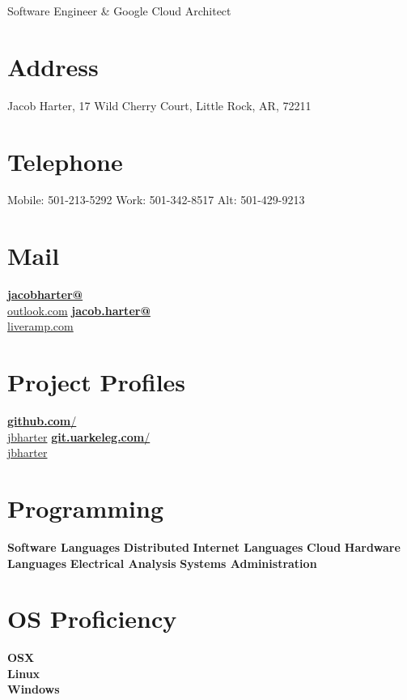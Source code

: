 \documentclass[]{friggeri-cv}
\begin{document}
      {Software Engineer \& Google Cloud Architect}


\begin{aside}
  \section{Address}
    Jacob Harter,
    17 Wild Cherry Court,
    Little Rock, AR, 72211
    ~
  \section{Telephone}
  Mobile: 501-213-5292
  Work: 501-342-8517
  Alt: 501-429-9213
    ~
  \section{Mail}
    \href{mailto:jacobharter@outlook.com}{\textbf{jacobharter@}\\outlook.com}
    \href{mailto:jacob.harter@liveramp.com}{\textbf{jacob.harter@}\\liveramp.com}
    ~
  \section{Project Profiles}
    \href{https://github.com/jbharter}{\textbf{github.com}/\\jbharter}
    \href{https://git.uarkeleg.com/users/jbharter}{\textbf{git.uarkeleg.com}/\\jbharter}
    ~
  \section{Programming}
        \textbf{Software Languages}
        {}
        \textbf{Distributed}
        {}
        \textbf{Internet Languages}
        {}
        \textbf{Cloud}
        {}
        \textbf{Hardware Languages}
        {}
        \textbf{Electrical Analysis}
        {}
        \textbf{Systems Administration}
        {}
    ~
  \section{OS Proficiency}
    \textbf{OSX}\\ %
    \textbf{Linux}\\  %
    \textbf{Windows}%
    ~
\end{aside}
\end{document}
